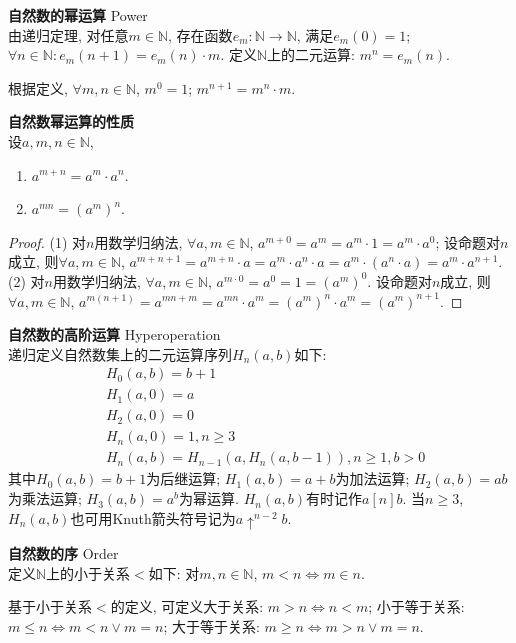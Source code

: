 \begin{dfn}\textbf{自然数的幂运算} Power\\
由递归定理, 对任意$m\in \mathbb{N}$, 存在函数$e_m: \mathbb{N} \to  \mathbb{N}$, 满足$e_m(0)=1$; $\forall n\in \mathbb{N}: e_m(n+1)=e_m(n)\cdot m$. 定义$\mathbb{N}$上的二元运算: $m^n=e_m(n)$. 
\end{dfn}
根据定义, $\forall m,n \in \mathbb{N}$, $m^0=1$; $m^{n+1}=m^n\cdot m$. 

\begin{pro}\textbf{自然数幂运算的性质}\\
设$a, m,n\in \mathbb{N}$,
\begin{enumerate}
    \item $a^{m+n}=a^m\cdot a^n$.
    \item $a^{mn}=(a^m)^n$. 
\end{enumerate}
\label{pro:natural_power}
\end{pro}
\begin{proof}
(1) 对$n$用数学归纳法, $\forall a, m\in \mathbb{N}$, $a^{m+0}=a^m=a^m\cdot 1 =a^m\cdot a^0$; 设命题对$n$成立, 则$\forall a, m\in \mathbb{N}$, $a^{m+n+1}=a^{m+n}\cdot a= a^m \cdot a^n\cdot a=a^m \cdot (a^n\cdot a)=a^m \cdot a^{n+1}$.
(2) 对$n$用数学归纳法, $\forall a, m\in \mathbb{N}$, $a^{m\cdot 0}=a^0=1=(a^m)^0$. 设命题对$n$成立, 则$\forall a, m\in \mathbb{N}$, $a^{m(n+1)}=a^{mn+m} = a^{mn} \cdot a^m=(a^m)^n \cdot a^m=(a^m)^{n+1}$.
\end{proof}

\begin{dfn}\textbf{自然数的高阶运算} Hyperoperation\\
递归定义自然数集上的二元运算序列$H_n(a,b)$如下:
\begin{align}
    &H_0(a,b)=b+1\\
    &H_1(a,0)=a\\
    &H_2(a,0)=0\\
    &H_n(a,0)=1, n\ge 3\\
    &H_n(a,b)=H_{n-1}(a,H_n(a,b-1)), n\ge 1, b>0
\end{align}
其中$H_0(a,b)=b+1$为后继运算; $H_1(a,b)=a+b$为加法运算; $H_2(a,b)=ab$为乘法运算; $H_3(a,b)=a^b$为幂运算. $H_n(a,b)$有时记作$a[n]b$. 当$n\ge 3$, $H_n(a,b)$也可用Knuth箭头符号记为$a\uparrow^{n-2}b$.  
\end{dfn}

\begin{dfn}\textbf{自然数的序} Order\\
定义$\mathbb{N}$上的小于关系$<$如下: 对$m,n \in \mathbb{N}$, $m<n \iff m\in n$. 
\end{dfn}
基于小于关系$<$的定义, 可定义大于关系: $m>n \iff n<m$; 小于等于关系: $m\le n \iff m<n \lor m=n$; 大于等于关系: $m\ge n \iff m>n \lor m=n$. 

